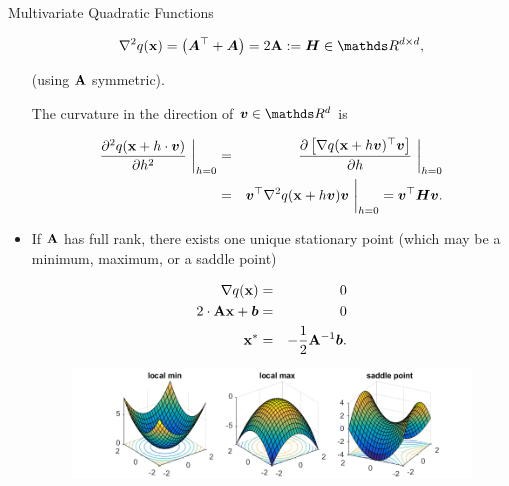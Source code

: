 \begin{vbframe}{Multivariate Quadratic Functions}
\begin{itemize}
    \begin{eqnarray*}
      \nabla^2 q(\xv) = \left(\bm{A}^\top + \bm{A}\right) = 2 \Amat := \bm{H} \in \R^{d \times d},
    \end{eqnarray*}
  
    (using $\mathbf{A}$ symmetric). 
  
    \vspace*{0.2cm}
  
    The curvature in the direction of $\bm{v}\in \R^d$ is 
  
    \begin{eqnarray*}
      \frac{\partial^2 q(\mathbf{x} + h \cdot \bm{v})}{\partial h^2}~\bigg\rvert_{h = 0} &=& \frac{\partial \left[\nabla q(\mathbf{x} + h \bm{v})^\top\bm{v}\right]}{\partial h}~\bigg\rvert_{h = 0} \\ &=& \bm{v}^\top \nabla^2 q(\mathbf{x} + h \bm{v}) \bm{v}~\bigg\rvert_{h = 0} = \bm{v}^\top \bm{H} \bm{v}.
    \end{eqnarray*}
  
  
    \item If $\mathbf{A}$ has full rank, there exists one unique stationary point (which may be a minimum, maximum, or a saddle point) 
  
    \begin{eqnarray*}
      \nabla q(\mathbf{x}) &=& 0 \\
      2 \cdot \mathbf{A} \mathbf{x} + \bm{b} &=& 0 \\
      \mathbf{x}^\ast &=& - \frac{1}{2} \mathbf{A}^{-1} \bm{b}.
    \end{eqnarray*}  
  
  
  \begin{figure}
    \includegraphics{figure_man/minmaxsaddle.png}\\
    \begin{footnotesize} 
    \end{footnotesize}
  \end{figure}
  
  
  \end{itemize}
  
  
  
  
  
  
  
  \end{vbframe}



  \endlecture
